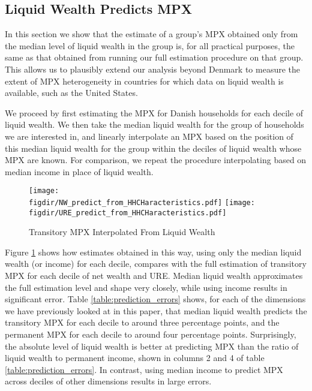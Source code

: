 \documentclass[titlepage]{\econtex}\newcommand{\texname}{ConsumptionHeterogeneity}
\newcommand{\figdir}{../Code/Rcode/Figures/AEJ_revision}
\begin{document}
	\subsection{Liquid Wealth Predicts MPX}
	\label{liquid_wealth_sufficient}
	In this section we show that the estimate of a group's MPX obtained only from the median level of liquid wealth in the group is, for all practical purposes, the same as that obtained from running our full estimation procedure on that group. This allows us to plausibly extend our analysis beyond Denmark to measure the extent of MPX heterogeneity in countries for which data on liquid wealth is available, such as the United States.
	
	We proceed by first estimating the MPX for Danish households for each decile of liquid wealth. We then take the median liquid wealth for the group of households we are interested in, and linearly interpolate an MPX based on the position of this median liquid wealth for the group within the deciles of liquid wealth whose MPX are known. For comparison, we repeat the procedure interpolating based on median income in place of liquid wealth.
	
	\begin{figure}
		\centering
		\texttt{[image: \\figdir/NW\_predict\_from\_HHCHaracteristics.pdf]}
		\centering
		\texttt{[image: \\figdir/URE\_predict\_from\_HHCHaracteristics.pdf]}
		\caption{Transitory MPX Interpolated From Liquid Wealth}
		\label{fig:MPXPredict}
	\end{figure}
	
	Figure \ref{fig:MPXPredict} shows how estimates obtained in this way, using only the median liquid wealth (or income) for each decile, compares with the full estimation of transitory MPX for each decile of net wealth and URE. Median liquid wealth approximates the full estimation level and shape very closely, while using income results in significant error. Table \ref{table:prediction_errors} shows, for each of the dimensions we have previously looked at in this paper, that median liquid wealth predicts the transitory MPX for each decile to around three percentage points, and the permanent MPX for each decile to around four percentage points. Surprisingly, the absolute level of liquid wealth is better at predicting MPX than the ratio of liquid wealth to permanent income, shown in columns 2 and 4 of table \ref{table:prediction_errors}. In contrast, using median income to predict MPX across deciles of other dimensions results in large errors.
	
\end{document}
